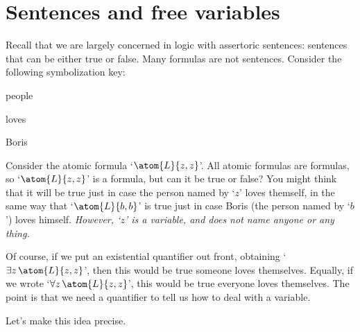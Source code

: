 

\section{Sentences and free variables}\label{s:FreeVars}

Recall that we are largely concerned in logic with assertoric
sentences: sentences that can be either true or false. Many formulas
are not sentences. Consider the following symbolization key:
	\begin{ekey}
		\item[\text{domain}] people
		\item[\atom{L}{x,y}]  loves 
		\item[b] Boris
	\end{ekey}
Consider the atomic formula `$\atom{L}{z,z}$'. All atomic formulas are
formulas, so `$\atom{L}{z,z}$' is a formula, but can it be true or
false? You might think that it will be true just in case the person
named by `$z$' loves themself, in the same way that `$\atom{L}{b,b}$'
is true just in case Boris (the person named by `$b$') loves himself.
\emph{However, `$z$' is a variable, and does not name anyone or any
thing.}

Of course, if we put an existential quantifier out front, obtaining
`$\exists z\,\atom{L}{z,z}$', then this would be true \ifeff{} someone
loves themselves. Equally, if we wrote `$\forall z\, \atom{L}{z,z}$',
this would be true \ifeff{} everyone loves themselves. The point is
that we need a quantifier to tell us how to deal with a variable.

Let's make this idea precise.


